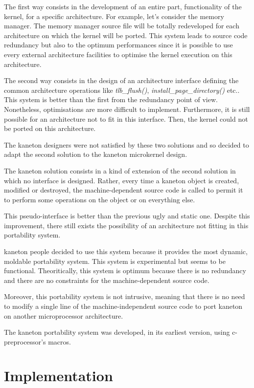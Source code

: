 {\begin{multicols}{2}
The first way consists in the development of an entire part, functionality
of the kernel, for a specific architecture. For example, let's consider the
memory manager. The memory manager source file will be totally redeveloped
for each architecture on which the kernel will be ported. This system leads
to source code redundancy but also to the optimum performances since
it is possible to use every external architecture facilities to optimise
the kernel execution on this architecture.

The second way consists in the design of an architecture interface defining
the common architecture operations like \textit{tlb\_flush()},
\textit{install\_page\_directory()} etc.. This system is better than the
first from the redundancy point of view. Nonetheless, optimisations are more
difficult to implement. Furthermore, it is still possible for an architecture
not to fit in this interface. Then, the kernel could not be ported on
this architecture.

The kaneton designers were not satisfied by these two solutions and so
decided to adapt the second solution to the kaneton microkernel design.

The kaneton solution consists in a kind of extension of the second solution
in which no interface is designed. Rather, every time a kaneton object is
created, modified or destroyed, the machine-dependent source code is called
to permit it to perform some operations on the object or on everything else.

This pseudo-interface is better than the previous ugly and static one.
Despite this improvement, there still exists the possibility of an
architecture not fitting in this portability system.

kaneton people decided to use this system because it provides the most
dynamic, moldable portability system. This system is experimental but
seems to be functional. Theoritically, this system is optimum because
there is no redundancy and there are no constraints for the
machine-dependent source code.

Moreover, this portability system is not intrusive, meaning that there
is no need to modify a single line of the machine-independent source code
to port kaneton on another microprocessor architecture.

The kaneton portability system was developed, in its earliest version,
using c-preprocessor's macros.

%
%

\section{Implementation}


\end{multicols}}
